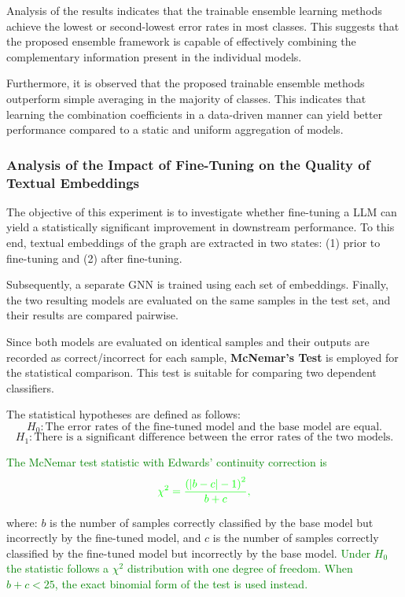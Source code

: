 \documentclass[a4paper,fleqn]{cas-sc}
\newcommand{\revthree}[1]{\textcolor{green}{#1}} %
\begin{document}
Analysis of the results indicates that the trainable ensemble learning methods achieve the lowest or second-lowest error rates in most classes. This suggests that the proposed ensemble framework is capable of effectively combining the complementary information present in the individual models. 

Furthermore, it is observed that the proposed trainable ensemble methods outperform simple averaging in the majority of classes. This indicates that learning the combination coefficients in a data-driven manner can yield better performance compared to a static and uniform aggregation of models.

\subsubsection{Analysis of the Impact of Fine-Tuning on the Quality of Textual Embeddings}

The objective of this experiment is to investigate whether fine-tuning a LLM can yield a statistically significant improvement in downstream performance. To this end, textual embeddings of the graph are extracted in two states:
(1) prior to fine-tuning and
(2) after fine-tuning.

Subsequently, a separate GNN is trained using each set of embeddings. Finally, the two resulting models are evaluated on the same samples in the test set, and their results are compared pairwise.

Since both models are evaluated on identical samples and their outputs are recorded as correct/incorrect for each sample, \textbf{McNemar's Test} is employed for the statistical comparison. This test is suitable for comparing two dependent classifiers.

The statistical hypotheses are defined as follows:
\[
H_0: \text{The error rates of the fine-tuned model and the base model are equal.}
\]
\[
H_1: \text{There is a significant difference between the error rates of the two models.}
\]

\revthree{The McNemar test statistic with Edwards' continuity correction is}
\begin{equation}
\revthree{\chi^2 = \frac{\left(|b - c| - 1\right)^2}{b + c},}
\label{eq:mcnemar}
\end{equation}

where:
\(b\) is the number of samples correctly classified by the base model but incorrectly by the fine-tuned model,
and \(c\) is the number of samples correctly classified by the fine-tuned model but incorrectly by the base model.
\revthree{Under $H_0$ the statistic follows a $\chi^2$ distribution with one degree of freedom. When $b+c<25$, the exact binomial form of the test is used instead.}
\end{document}
